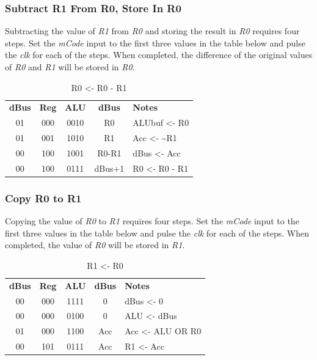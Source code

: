 \subsubsection{Subtract R1 From R0, Store In R0}

Subtracting the value of \textit{R1} from \textit{R0} and storing the result in \textit{R0} requires four steps. Set the \textit{mCode} input to the first three values in the table below and pulse the \textit{clk} for each of the steps. When completed, the difference of the original values of \textit{R0} and \textit{R1} will be stored in \textit{R0}.

\begin{table}[H]
	\sffamily
	\newcommand{\head}[1]{\textcolor{white}{\textbf{#1}}}		
	\begin{center}
		\begin{tabular}{ccccl} 
			\textbf{dBus} & \textbf{Reg} & \textbf{ALU} & \textbf{dBus} & \textbf{Notes} \\
			01 & 000 & 0010 & R0 & ALUbuf <- R0 \\
			01 & 001 & 1010 & R1 & Acc <- \textasciitilde R1 \\
			00 & 100 & 1001 & R0-R1 & dBus <- Acc \\
			00 & 100 & 0111 & dBus+1 & R0 <- R0 - R1
		\end{tabular}
	\end{center}
	\caption{R0 <- R0 - R1}
	\label{tab:11-06}
\end{table}

\subsubsection{Copy R0 to R1}

Copying the value of \textit{R0} to \textit{R1} requires four steps. Set the \textit{mCode} input to the first three values in the table below and pulse the \textit{clk} for each of the steps. When completed, the value of \textit{R0} will be stored in \textit{R1}.

\begin{table}[H]
	\sffamily
	\newcommand{\head}[1]{\textcolor{white}{\textbf{#1}}}		
	\begin{center}
		\begin{tabular}{ccccl} 
			\textbf{dBus} & \textbf{Reg} & \textbf{ALU} & \textbf{dBus} & \textbf{Notes} \\
			00 & 000 & 1111 & 0 & dBus <- 0 \\
			00 & 000 & 0100 & 0 & ALU <- dBus \\
			01 & 000 & 1100 & Acc & Acc <- ALU OR R0 \\
			00 & 101 & 0111 & Acc & R1 <- Acc
		\end{tabular}
	\end{center}
	\caption{R1 <- R0}
	\label{tab:11-07}
\end{table}

